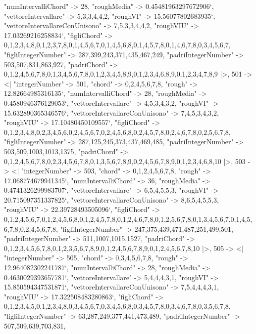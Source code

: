 \documentclass[
]{article}
\begin{document}
\begin{DatasetVerbatim}
    "numIntervalliChord" -> 28,
    "roughMedia" -> 0.45481963297672906`,
    "vettoreIntervallare" -> {5,3,3,4,4,2},
    "roughVI" -> 15.56077802683935`,
    "vettoreIntervallareConUnisono" -> {7,5,3,3,4,4,2},
    "roughVIU" -> 17.03269216258834`,
    "figliChord" -> {{0,1,2,3,4,8},{0,1,2,3,7,8},{0,1,4,5,6,7},{0,1,4,5,6,8},{0,1,4,5,7,8},{0,1,4,6,7,8},{0,3,4,5,6,7}},
    "figliIntegerNumber" -> {287,399,243,371,435,467,249},
    "padriIntegerNumber" -> {503,507,831,863,927},
    "padriChord" -> {{0,1,2,4,5,6,7,8},{0,1,3,4,5,6,7,8},{0,1,2,3,4,5,8,9},{0,1,2,3,4,6,8,9},{0,1,2,3,4,7,8,9}}
  |>,
  501 -> <|
    "integerNumber" -> 501,
    "chord" -> {0,2,4,5,6,7,8},
    "rough" -> 12.82664985316135`,
    "numIntervalliChord" -> 28,
    "roughMedia" -> 0.4580946376129053`,
    "vettoreIntervallare" -> {4,5,3,4,3,2},
    "roughVI" -> 15.632890365346576`,
    "vettoreIntervallareConUnisono" -> {7,4,5,3,4,3,2},
    "roughVIU" -> 17.10480450109557`,
    "figliChord" -> {{0,1,2,3,4,8},{0,2,3,4,5,6},{0,2,4,5,6,7},{0,2,4,5,6,8},{0,2,4,5,7,8},{0,2,4,6,7,8},{0,2,5,6,7,8}},
    "figliIntegerNumber" -> {287,125,245,373,437,469,485},
    "padriIntegerNumber" -> {503,509,1003,1013,1375},
    "padriChord" -> {{0,1,2,4,5,6,7,8},{0,2,3,4,5,6,7,8},{0,1,3,5,6,7,8,9},{0,2,4,5,6,7,8,9},{0,1,2,3,4,6,8,10}}
  |>,
  503 -> <|
    "integerNumber" -> 503,
    "chord" -> {0,1,2,4,5,6,7,8},
    "rough" -> 17.068774679941345`,
    "numIntervalliChord" -> 36,
    "roughMedia" -> 0.4741326299983707`,
    "vettoreIntervallare" -> {6,5,4,5,5,3},
    "roughVI" -> 20.715097351337825`,
    "vettoreIntervallareConUnisono" -> {8,6,5,4,5,5,3},
    "roughVIU" -> 22.39728493505096`,
    "figliChord" -> {{0,1,2,4,5,6,7},{0,1,2,4,5,6,8},{0,1,2,4,5,7,8},{0,1,2,4,6,7,8},{0,1,2,5,6,7,8},{0,1,3,4,5,6,7},{0,1,4,5,6,7,8},{0,2,4,5,6,7,8}},
    "figliIntegerNumber" -> {247,375,439,471,487,251,499,501},
    "padriIntegerNumber" -> {511,1007,1015,1527},
    "padriChord" -> {{0,1,2,3,4,5,6,7,8},{0,1,2,3,5,6,7,8,9},{0,1,2,4,5,6,7,8,9},{0,1,2,4,5,6,7,8,10}}
  |>,
  505 -> <|
    "integerNumber" -> 505,
    "chord" -> {0,3,4,5,6,7,8},
    "rough" -> 12.964082302241787`,
    "numIntervalliChord" -> 28,
    "roughMedia" -> 0.4630029393657781`,
    "vettoreIntervallare" -> {5,4,4,4,3,1},
    "roughVI" -> 15.850594347531871`,
    "vettoreIntervallareConUnisono" -> {7,5,4,4,4,3,1},
    "roughVIU" -> 17.322508483280863`,
    "figliChord" -> {{0,1,2,3,4,5},{0,1,2,3,4,8},{0,3,4,5,6,7},{0,3,4,5,6,8},{0,3,4,5,7,8},{0,3,4,6,7,8},{0,3,5,6,7,8}},
    "figliIntegerNumber" -> {63,287,249,377,441,473,489},
    "padriIntegerNumber" -> {507,509,639,703,831},

\end{DatasetVerbatim}
\end{document}
